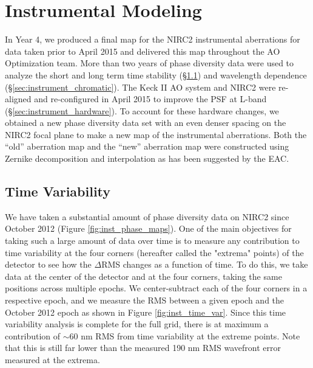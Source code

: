 \section{Instrumental Modeling}
\label{sec:instrument}

In Year 4, we produced a final map for the NIRC2 instrumental
aberrations for data taken prior to April 2015 and delivered this map
throughout the AO Optimization team. More than two years of
phase diversity data were used to analyze the short and long term time
stability (\S\ref{sec:instrument_time}) and wavelength dependence 
(\S\ref{sec:instrument_chromatic}). 
The Keck \textrm{II} AO system and NIRC2 were re-aligned and
re-configured in April 2015 to improve the PSF at L-band
(\S\ref{sec:instrument_hardware}). To account for these hardware changes, we 
obtained a new phase diversity data set with an even denser spacing on
the NIRC2 focal plane to make a new map of the instrumental
aberrations.
Both the ``old'' aberration map and the ``new'' aberration map were
constructed using Zernike decomposition and interpolation as has been
suggested by the EAC.

\subsection{Time Variability}
\label{sec:instrument_time}
We have taken a substantial amount of phase diversity data on NIRC2
since October 2012 (Figure \ref{fig:inst_phase_maps}). One of the main objectives
for taking such a large amount of data over time is to measure any
contribution to time variability at the four corners (hereafter called
the "extrema" points) of the detector to see how the $\Delta$RMS
changes as a function of time. To do this, we take data at the center
of the detector and at the four corners, taking the same positions
across multiple epochs. We center-subtract each of the four corners in
a respective epoch, and we measure the RMS between a given epoch and
the October 2012 epoch as shown in Figure \ref{fig:inst_time_var}. 
Since this time variability analysis is complete for the full grid,
there is at maximum a contribution of $\sim$60 nm RMS from time
variability at the extreme points. Note that this is still far lower
than the measured 190 nm RMS wavefront error measured at the extrema.


    
    
    
    
    
  
  
  
  
  